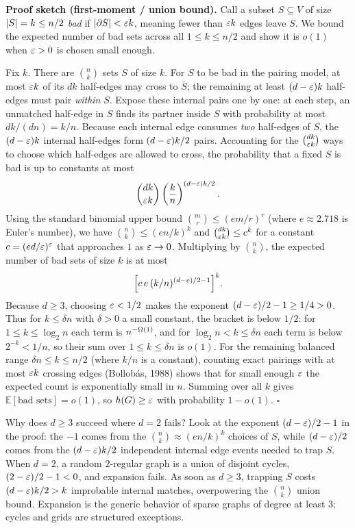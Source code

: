 \begin{whybox}
\textbf{Proof sketch (first-moment / union bound).} Call a subset $S\subseteq V$ of size $\lvert S\rvert=k\le n/2$ \emph{bad} if $\lvert\partial S\rvert<\varepsilon k$, meaning fewer than $\varepsilon k$ edges leave $S$. We bound the expected number of bad sets across all $1\le k\le n/2$ and show it is $o(1)$ when $\varepsilon>0$ is chosen small enough.

Fix $k$. There are $\binom{n}{k}$ sets $S$ of size $k$. For $S$ to be bad in the pairing model, at most $\varepsilon k$ of its $dk$ half-edges may cross to $\bar S$; the remaining at least $(d-\varepsilon)k$ half-edges must pair \emph{within} $S$. Expose these internal pairs one by one: at each step, an unmatched half-edge in $S$ finds its partner inside $S$ with probability at most $dk/(dn)=k/n$. Because each internal edge consumes \emph{two} half-edges of $S$, the $(d-\varepsilon)k$ internal half-edges form $(d-\varepsilon)k/2$ pairs. Accounting for the $\binom{dk}{\varepsilon k}$ ways to choose which half-edges are allowed to cross, the probability that a fixed $S$ is bad is up to constants at most
\[
  \binom{dk}{\varepsilon k}\left(\frac{k}{n}\right)^{(d-\varepsilon)k/2}.
\]
Using the standard binomial upper bound $\binom{m}{r}\le (em/r)^r$ (where $e\approx 2.718$ is Euler's number), we have $\binom{n}{k}\le (en/k)^k$ and $\binom{dk}{\varepsilon k}\le c^k$ for a constant $c=(ed/\varepsilon)^\varepsilon$ that approaches $1$ as $\varepsilon\to 0$. Multiplying by $\binom{n}{k}$, the expected number of bad sets of size $k$ is at most
\[
  \Bigl[c\,e\,(k/n)^{(d-\varepsilon)/2-1}\Bigr]^{k}.
\]
Because $d\ge 3$, choosing $\varepsilon<1/2$ makes the exponent $(d-\varepsilon)/2-1 \ge 1/4 > 0$. Thus for $k\le\delta n$ with $\delta>0$ a small constant, the bracket is below $1/2$: for $1\le k\le\log_2 n$ each term is $n^{-\Omega(1)}$, and for $\log_2 n < k \le \delta n$ each term is below $2^{-k}<1/n$, so their sum over $1\le k\le\delta n$ is $o(1)$. For the remaining balanced range $\delta n \le k \le n/2$ (where $k/n$ is a constant), counting exact pairings with at most $\varepsilon k$ crossing edges (Bollob\'as, 1988) shows that for small enough $\varepsilon$ the expected count is exponentially small in $n$. Summing over all $k$ gives $\mathbb{E}[\text{bad sets}]=o(1)$, so $h(G)\ge\varepsilon$ with probability $1-o(1)$. \hfill$\square$
\end{whybox}

\begin{intuitionbox}
Why does $d\ge 3$ succeed where $d=2$ fails? Look at the exponent $(d-\varepsilon)/2 - 1$ in the proof: the $-1$ comes from the $\binom{n}{k}\approx (en/k)^k$ choices of $S$, while $(d-\varepsilon)/2$ comes from the $(d-\varepsilon)k/2$ independent internal edge events needed to trap $S$. When $d=2$, a random $2$-regular graph is a union of disjoint cycles, $(2-\varepsilon)/2 - 1 < 0$, and expansion fails. As soon as $d\ge 3$, trapping $S$ costs $(d-\varepsilon)k/2 > k$ improbable internal matches, overpowering the $\binom{n}{k}$ union bound. Expansion is the generic behavior of sparse graphs of degree at least $3$; cycles and grids are structured exceptions.
\end{intuitionbox}


